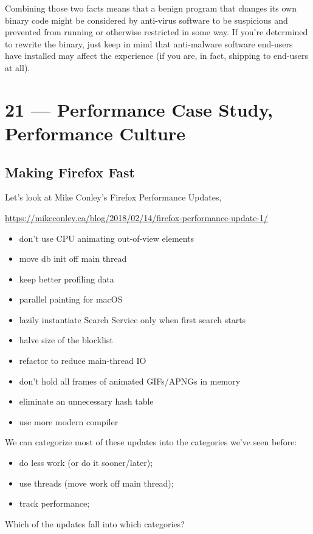 \documentclass[a4paper]{report}
\begin{document}
Combining those two facts means that a benign program that changes its own binary code might be considered by anti-virus software to be suspicious and prevented from running or otherwise restricted in some way. If you're determined to rewrite the binary, just keep in mind that anti-malware software end-users have installed may affect the experience (if you are, in fact, shipping to end-users at all).








\chapter*{21 --- Performance Case Study, Performance Culture}


\section*{Making Firefox Fast}

Let's look at Mike Conley's Firefox Performance Updates,
\begin{center}
{\scriptsize
\vspace*{-1em}
\url{https://mikeconley.ca/blog/2018/02/14/firefox-performance-update-1/}
}
\end{center}
\vspace*{-1em}

\begin{itemize}[noitemsep]
\item don't use CPU animating out-of-view elements
\item move db init off main thread
\item keep better profiling data
\item parallel painting for macOS
\item lazily instantiate Search Service only when first search starts
\item halve size of the blocklist
\item refactor to reduce main-thread IO
\item don't hold all frames of animated GIFs/APNGs in memory
\item eliminate an unnecessary hash table
\item use more modern compiler
\end{itemize}

We can categorize most of these updates into the categories we've seen before:
\begin{itemize}[noitemsep]
\item do less work (or do it sooner/later);
\item use threads (move work off main thread);
\item track performance;
\end{itemize}
Which of the updates fall into which categories?
\end{document}
